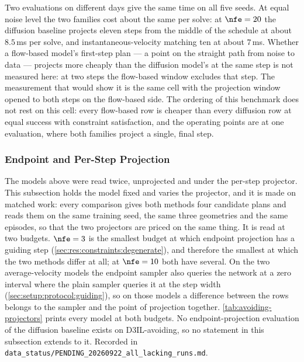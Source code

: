 Two evaluations on different days give the same time on all five seeds. At equal noise level the two
families cost about the same per solve: at $\nfe=20$ the diffusion baseline projects eleven steps from
the middle of the schedule at about $8.5$\,ms per solve, and instantaneous-velocity matching ten at about
$7$\,ms. Whether a flow-based model's first-step plan --- a point on the straight path from noise to
data --- projects more cheaply than the diffusion model's at the same step is not measured here: at two
steps the flow-based window excludes that step. The measurement that would show it is the same cell with
the projection window opened to both steps on the flow-based side.
The ordering of this benchmark does not rest on this cell: every flow-based row is cheaper than
every diffusion row at equal success with constraint satisfaction, and the operating points are at one
evaluation, where both families project a single, final step.

\subsubsection{Endpoint and Per-Step Projection}\label{sec:res:avoiding:projectors}

The models above were read twice, unprojected and under the per-step projector. This subsection holds the
model fixed and varies the projector, and it is made on matched work: every comparison gives both methods
four candidate plans and reads them on the same training seed, the same three geometries and the same
episodes, so that the two projectors are priced on the same thing. It is read at two budgets. $\nfe=3$ is
the smallest budget at which endpoint projection has a guiding step
(\autoref{sec:res:constraints:degenerate}), and therefore the smallest at which the two methods differ at
all; at $\nfe=10$ both have several. On the two average-velocity models the endpoint sampler also
queries the network at a zero interval where the plain sampler queries it at the step width
(\autoref{sec:setup:protocol:guiding}), so on those models a difference between the rows belongs to the
sampler and the point of projection together. \autoref{tab:avoiding-projectors} prints every model at both budgets.
No endpoint-projection evaluation of the diffusion baseline exists on D3IL-avoiding, so no
statement in this subsection extends to it. Recorded in
\texttt{data\_status/PENDING\_20260922\_all\_lacking\_runs.md}.

